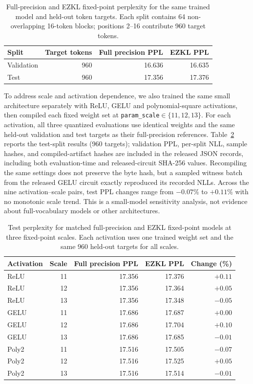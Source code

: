\documentclass[10pt]{article}
\begin{document}
\begin{table}[t]
\centering
\caption{Full-precision and EZKL fixed-point perplexity for the same trained
  model and held-out token targets. Each split contains 64 non-overlapping
  16-token blocks; positions 2--16 contribute 960 target tokens.}
\label{tab:joint}
\begin{tabular}{lrrr}
\toprule
Split & Target tokens & Full precision PPL & EZKL PPL \\
\midrule
Validation & 960 & 16.636 & 16.635 \\
Test & 960 & 17.356 & 17.376 \\
\bottomrule
\end{tabular}
\end{table}

To address scale and activation dependence, we also trained the same small
architecture separately with ReLU, GELU and polynomial-square activations, then
compiled each fixed weight set at
\texttt{param\_scale}$\in\{11,12,13\}$. For each activation, all three
quantized evaluations use identical weights and the same held-out validation
and test targets as their full-precision references. Table~\ref{tab:quant_scales}
reports the test-split results (960 targets); validation PPL, per-split NLL,
sample hashes, and compiled-artifact hashes are included in the released JSON
records, including both evaluation-time and released-circuit SHA-256 values.
Recompiling the same settings does not preserve the byte hash, but a sampled
witness batch from the released GELU circuit exactly reproduced its recorded
NLLs. Across the nine activation--scale pairs, test PPL changes range from
$-0.07\%$ to $+0.11\%$ with no monotonic scale trend. This is a small-model
sensitivity analysis, not evidence about full-vocabulary models or other
architectures.

\begin{table}[t]
\centering
\caption{Test perplexity for matched full-precision and EZKL fixed-point models
  at three fixed-point scales. Each activation uses one trained weight set and
  the same 960 held-out targets for all scales.}
\label{tab:quant_scales}
\begin{tabular}{lrrrr}
\toprule
Activation & Scale & Full precision PPL & EZKL PPL & Change (\%) \\
\midrule
ReLU & 11 & 17.356 & 17.376 & $+0.11$ \\
ReLU & 12 & 17.356 & 17.364 & $+0.05$ \\
ReLU & 13 & 17.356 & 17.348 & $-0.05$ \\
GELU & 11 & 17.686 & 17.687 & $+0.00$ \\
GELU & 12 & 17.686 & 17.704 & $+0.10$ \\
GELU & 13 & 17.686 & 17.685 & $-0.01$ \\
Poly2 & 11 & 17.516 & 17.505 & $-0.07$ \\
Poly2 & 12 & 17.516 & 17.525 & $+0.05$ \\
Poly2 & 13 & 17.516 & 17.514 & $-0.01$ \\
\bottomrule
\end{tabular}
\end{table}
\end{document}
